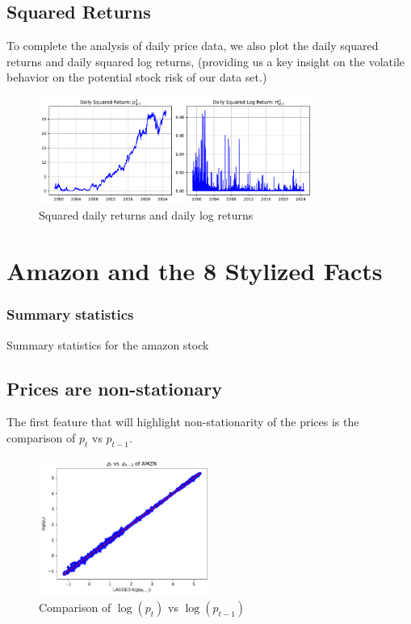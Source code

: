 \documentclass{article}
\begin{document}
\subsection{Squared Returns}

To complete the analysis of daily price data, we also plot the daily squared returns and daily squared log returns, 
(providing us a key insight on the volatile behavior on the potential stock risk of our data set.)
\begin{figure}[H]
    \centering
    \includegraphics[width=0.8\textwidth]{Img/squared_log_returns.pdf}
    \caption{Squared daily returns and daily log returns}
    \label{fig:squared_logreturns}
\end{figure}

\section{Amazon and the 8 Stylized Facts}

\subsubsection{Summary statistics}


\begin{table}[H]
    \centering
      
    \caption{Summary statistics for the amazon stock}
    \label{tab:Stylized_facts_preview}
\end{table}



\subsection{Prices are non-stationary}

The first feature that will highlight non-stationarity of
the prices is the comparison of \( p_t \) vs \( p_{t-1} \).

\begin{figure}[H]
    \centering
    \includegraphics[width=0.5\textwidth]{Img/Laggedlog(p_t-1).pdf}
    \caption{Comparison of \( \log(p_t) \) vs \( \log(p_{t-1}) \)}
    \label{fig:LogptVSLogpt-1}
\end{figure}
\end{document}
